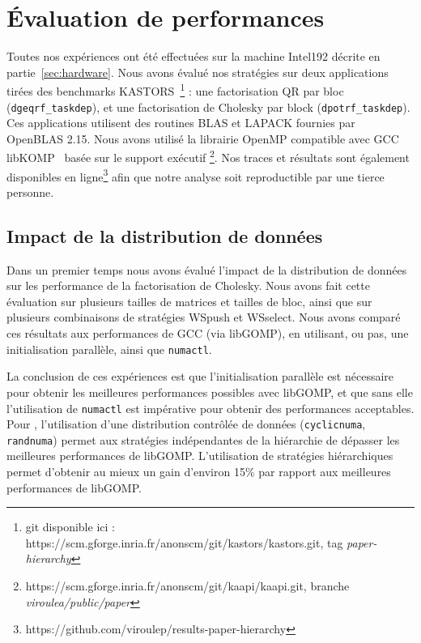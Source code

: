 \documentclass[parallelisme]{compas2016}
\begin{document}
\section{Évaluation de performances}
\label{sec:performances-evaluation}
Toutes nos expériences ont été effectuées sur la machine Intel192 décrite en partie~\ref{sec:hardware}.
Nous avons évalué nos stratégies sur deux applications tirées des benchmarks
KASTORS~\cite{virouleau:hal-01081974}\footnote{git disponible ici : https://scm.gforge.inria.fr/anonscm/git/kastors/kastors.git, tag \emph{paper-hierarchy}} :
une factorisation QR par bloc (\verb/dgeqrf_taskdep/), et une factorisation de
Cholesky par block (\verb/dpotrf_taskdep/).
Ces applications utilisent des routines BLAS et LAPACK fournies par OpenBLAS 2.15.
Nous avons utilisé la librairie OpenMP compatible avec GCC libKOMP~\cite{libkomp} basée
sur le support exécutif \kaapi\footnote{https://scm.gforge.inria.fr/anonscm/git/kaapi/kaapi.git,
branche \emph{viroulea/public/paper}}.
Nos traces et résultats sont également disponibles en ligne\footnote{https://github.com/viroulep/results-paper-hierarchy} afin que notre analyse
soit reproductible par une tierce personne.


\vspace*{-1ex}
\subsection{Impact de la distribution de données}

Dans un premier temps nous avons évalué l'impact de la distribution de données sur
les performance de la factorisation de Cholesky. Nous avons fait cette évaluation sur plusieurs
tailles de matrices et tailles de bloc, ainsi que sur plusieurs combinaisons
de stratégies WSpush et WSselect. Nous avons comparé ces résultats aux performances de GCC (via libGOMP),
en utilisant, ou pas, une initialisation parallèle, ainsi que \verb/numactl/.

La conclusion de ces expériences est que l'initialisation parallèle est nécessaire
pour obtenir les meilleures performances possibles avec libGOMP, et que sans elle l'utilisation
de \verb/numactl/ est impérative pour obtenir des performances acceptables.
Pour \kaapi, l'utilisation d'une distribution contrôlée de données (\verb/cyclicnuma/,
\verb/randnuma/) permet aux stratégies indépendantes de la hiérarchie de dépasser
les meilleures performances de libGOMP. L'utilisation de stratégies hiérarchiques
permet d'obtenir au mieux un gain d'environ 15\% par rapport aux meilleures performances de libGOMP.
\end{document}
